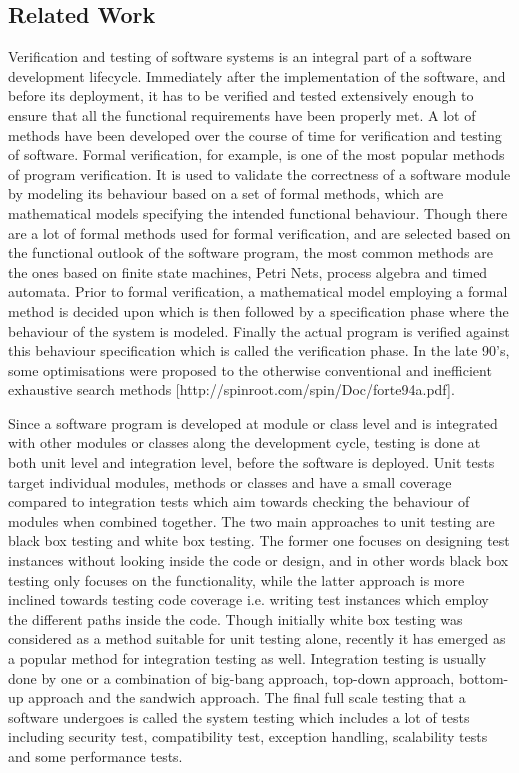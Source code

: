 \raggedbottom
\subsection{Related Work}

Verification and testing of software systems is an integral part of a software development lifecycle. Immediately after the implementation of the software, and before its deployment, it has to be verified and tested extensively enough to ensure that all the functional requirements have been properly met. A lot of methods have been developed over the course of time for verification and testing of software. Formal verification, for example, is one of the most popular methods of program verification. It is used to validate the correctness of a software module by modeling its behaviour based on a set of formal methods, which are mathematical models specifying the intended functional behaviour. Though there are a lot of formal methods used for formal verification, and are selected based on the functional outlook of the software program, the most common methods are the ones based on finite state machines, Petri Nets, process algebra and timed automata. Prior to formal verification, a mathematical model employing a formal method is decided upon which is then followed by a specification phase where the behaviour of the system is modeled. Finally the actual program is verified against this behaviour specification which is called the verification phase. In the late 90's, some optimisations were proposed to the otherwise conventional and inefficient exhaustive search methods [http://spinroot.com/spin/Doc/forte94a.pdf].

Since a software program is developed at module or class level and is integrated with other modules or classes along the development cycle, testing is done at both unit level and integration level, before the software is deployed. Unit tests target individual modules, methods or classes and have a small coverage compared to integration tests which aim towards checking the behaviour of modules when combined together. The two main approaches to unit testing are black box testing and white box testing. The former one focuses on designing test instances without looking inside the code or design, and in other words black box testing only focuses on the functionality, while the latter approach is more inclined towards testing code coverage i.e. writing test instances which employ the different paths inside the code. Though initially white box testing was considered as a method suitable for unit testing alone, recently it has emerged as a popular method for integration testing as well. Integration testing is usually done by one or a combination of big-bang approach, top-down approach, bottom-up approach and the sandwich approach. The final full scale testing that a software undergoes is called the system testing which includes a lot of tests including security test, compatibility test, exception handling, scalability tests and some performance tests. 


